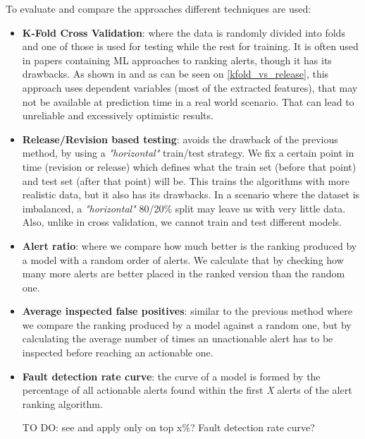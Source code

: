 To evaluate and compare the approaches different techniques are used: 
\begin{itemize}
    \item \textbf{K-Fold Cross Validation}: where the data is randomly divided into folds and one of those is used for testing while the rest for training. It is often used in papers containing ML approaches to ranking alerts, though it has its drawbacks. As shown in \cite{performance_method_bug} and as can be seen on \cref{kfold_vs_release}, this approach uses dependent variables (most of the extracted features), that may not be available at prediction time in a real world scenario. That can lead to unreliable and excessively optimistic results.
    \item \textbf{Release/Revision based testing}: avoids the drawback of the previous method, by using a \textit{"horizontal"} train/test strategy. We fix a certain point in time (revision or release) which defines what the train set (before that point) and test set (after that point) will be. This trains the algorithms with more realistic data, but it also has its drawbacks. In a scenario where the dataset is imbalanced, a \textit{"horizontal"} 80/20\% split may leave us with very little data. Also, unlike in cross validation, we cannot train and test different models.
    \item \textbf{Alert ratio}: where we compare how much better is the ranking produced by a model with a random order of alerts. We calculate that by checking how many more alerts are better placed in the ranked version than the random one.
    \item \textbf{Average inspected false positives}: similar to the previous method where we compare the ranking produced by a model against a random one, but by calculating the average  number of times an unactionable alert has to be inspected before reaching an actionable one.
    \item \textbf{Fault detection rate curve}: the curve of a model is formed by the percentage of all actionable alerts found within the first \textit{X} alerts of the alert
    ranking algorithm.
    
    TO DO: see \cite{compare_framework} and apply only on top x\%? Fault detection rate curve?
    
\end{itemize}

